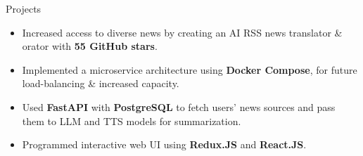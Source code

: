 \documentclass{resume} %
\begin{document}
\begin{workSection}{Projects}
	\customItem[
		title=\href{https://github.com/AshkanArabim/newsbridge}{Newsbridge \faExternalLink},
		duration=Team of 4 | September 2024 - December 2024,
	]
	\begin{itemize}
		\vspace{-0.5em}
		\itemsep -6pt {}
		\item Increased access to diverse news by creating an AI RSS news translator \& orator with \textbf{55 GitHub stars}.
		\item Implemented a microservice architecture using \textbf{Docker Compose}, for future load-balancing \& increased capacity.
		\item Used \textbf{FastAPI} with \textbf{PostgreSQL} to fetch users' news sources and pass them to LLM and TTS models for summarization.
		\item Programmed interactive web UI using \textbf{Redux.JS} and \textbf{React.JS}.
	\end{itemize}
	

\end{workSection}
\end{document}
